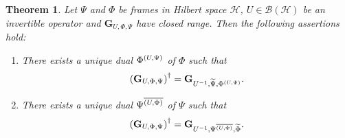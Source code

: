 \documentclass{birkjour}
\newtheorem{thm}{Theorem}[section]
\theoremstyle{definition}
\theoremstyle{remark}
\numberwithin{equation}{section}
\newcommand{\BL}[1]{
{\mathcal B} \left( #1 \right)
}
\begin{document}
\begin{thm} \label{inverse Gram}Let $\Psi$ and $\Phi$ be frames in Hilbert
space  $\mathcal{H}$,
  $U\in \BL{\mathcal{H}}$ be an invertible
operator and $\mathbf{G}_{U,\Phi,\Psi}$ have
 closed range. Then the following assertions hold:
\begin{enumerate}
\item[(1)]  There exists a unique dual $\Phi^{\left(U,\Psi\right)}$ of $\Phi$ such that
\begin{eqnarray*}
\left(\mathbf{G}_{U,\Phi,\Psi}\right)^{\dagger}=\mathbf{G}_{U^{-1},\widetilde{\Psi},\Phi^{\left(U,\Psi\right)}}.
\end{eqnarray*}
\item[(2)]There exists a unique dual $\Psi^{\overline{\left( U,\Phi\right)}}$ 
 of $\Psi$ such that
\begin{eqnarray*}
\left(\mathbf{G}_{U,\Phi,\Psi}\right)^{\dagger}=\mathbf{G}_{U^{-1},\Psi^{\overline{\left( U,\Phi\right)}},\widetilde{\Phi}}.
\end{eqnarray*}
\end{enumerate}
\end{thm}
\end{document}

